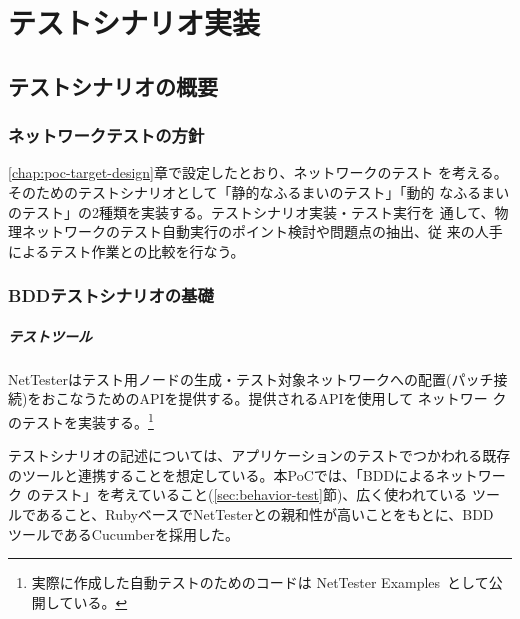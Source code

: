 
\chapter{テストシナリオ実装}
\label{chap:poc-scenario-dev}

 \section{テストシナリオの概要}

  \subsection{ネットワークテストの方針}

\ref{chap:poc-target-design}章で設定したとおり、\yo ネットワークのテスト
を考える。そのためのテストシナリオとして「静的なふるまいのテスト」「動的
なふるまいのテスト」の2種類を実装する。テストシナリオ実装・テスト実行を
通して、物理ネットワークのテスト自動実行のポイント検討や問題点の抽出、従
来の人手によるテスト作業との比較を行なう。

  \subsection{BDDテストシナリオの基礎}

      \paragraph{テストツール}
NetTesterはテスト用ノードの生成・テスト対象ネットワークへの配置(パッチ接
続)をおこなうためのAPIを提供する。提供されるAPIを使用して \yo ネットワー
クのテストを実装する。\footnote{実際に作成した自動テストのためのコードは
NetTester Examples~\cite{nettester-ex}として公開している。}

テストシナリオの記述については、アプリケーションのテストでつかわれる既存
のツールと連携することを想定している。本PoCでは、「BDDによるネットワーク
のテスト」を考えていること(\ref{sec:behavior-test}節)、広く使われている
ツールであること、RubyベースでNetTesterとの親和性が高いことをもとに、BDD
ツールであるCucumber\cite{cucumber}を採用した。

